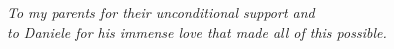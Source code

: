 {\pagestyle{empty}

\null{}
\begin{flushright}
\textit{To my parents for their unconditional support and\\ to Daniele for his immense love that made all of this possible.}
\end{flushright}
\null{}

\cleardoublepage}

\frontmatter 

\cleardoublepage
{}
\tableofcontents %

\mainmatter %
